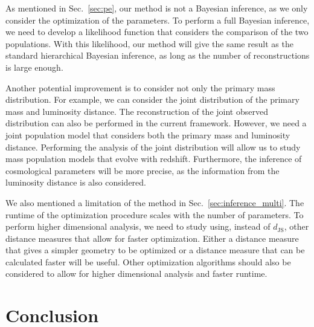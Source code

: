 \documentclass[twocolumn]{aastex631}
\begin{document}
As mentioned in Sec.~\ref{sec:pe}, our method is not a Bayesian inference, as we only consider the optimization of the parameters.
To perform a full Bayesian inference, we need to develop a likelihood function that considers the comparison of the two populations.
With this likelihood, our method will give the same result as the standard hierarchical Bayesian inference, as long as the number of reconstructions is large enough.

Another potential improvement is to consider not only the primary mass distribution.
For example, we can consider the joint distribution of the primary mass and luminosity distance.
The reconstruction of the joint observed distribution can also be performed in the current framework.
However, we need a joint population model that considers both the primary mass and luminosity distance.
Performing the analysis of the joint distribution will allow us to study mass population models that evolve with redshift.
Furthermore, the inference of cosmological parameters will be more precise, as the information from the luminosity distance is also considered.

We also mentioned a limitation of the method in Sec.~\ref{sec:inference_multi}.
The runtime of the optimization procedure scales with the number of parameters.
To perform higher dimensional analysis, we need to study using, instead of $d_\mathrm{JS}$, other distance measures that allow for faster optimization.
Either a distance measure that gives a simpler geometry to be optimized or a distance measure that can be calculated faster will be useful.
Other optimization algorithms should also be considered to allow for higher dimensional analysis and faster runtime.

\section{Conclusion}
\label{sec:conclusion}
\end{document}
